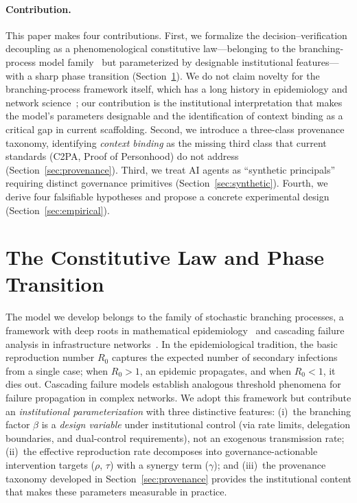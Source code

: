 \documentclass[runningheads]{llncs}
\begin{document}
\paragraph{Contribution.}
This paper makes four contributions. First, we formalize the decision--verification decoupling as a phenomenological constitutive law---belonging to the branching-process model family~\cite{anderson1991infectious,hethcote2000mathematics} but parameterized by designable institutional features---with a sharp phase transition (Section~\ref{sec:constitutive}). We do not claim novelty for the branching-process framework itself, which has a long history in epidemiology and network science~\cite{watts2002simple,buldyrev2010catastrophic}; our contribution is the institutional interpretation that makes the model's parameters designable and the identification of context binding as a critical gap in current scaffolding. Second, we introduce a three-class provenance taxonomy, identifying \emph{context binding} as the missing third class that current standards (C2PA, Proof of Personhood) do not address (Section~\ref{sec:provenance}). Third, we treat AI agents as ``synthetic principals'' requiring distinct governance primitives (Section~\ref{sec:synthetic}). Fourth, we derive four falsifiable hypotheses and propose a concrete experimental design (Section~\ref{sec:empirical}).


\section{The Constitutive Law and Phase Transition}
\label{sec:constitutive}

The model we develop belongs to the family of stochastic branching processes, a framework with deep roots in mathematical epidemiology~\cite{anderson1991infectious,hethcote2000mathematics} and cascading failure analysis in infrastructure networks~\cite{watts2002simple,buldyrev2010catastrophic,dobson2024cascading}. In the epidemiological tradition, the basic reproduction number $R_0$ captures the expected number of secondary infections from a single case; when $R_0 > 1$, an epidemic propagates, and when $R_0 < 1$, it dies out. Cascading failure models establish analogous threshold phenomena for failure propagation in complex networks. We adopt this framework but contribute an \emph{institutional parameterization} with three distinctive features: (i)~the branching factor $\beta$ is a \emph{design variable} under institutional control (via rate limits, delegation boundaries, and dual-control requirements), not an exogenous transmission rate; (ii)~the effective reproduction rate decomposes into governance-actionable intervention targets ($\rho$, $\tau$) with a synergy term ($\gamma$); and (iii)~the provenance taxonomy developed in Section~\ref{sec:provenance} provides the institutional content that makes these parameters measurable in practice.
\end{document}
